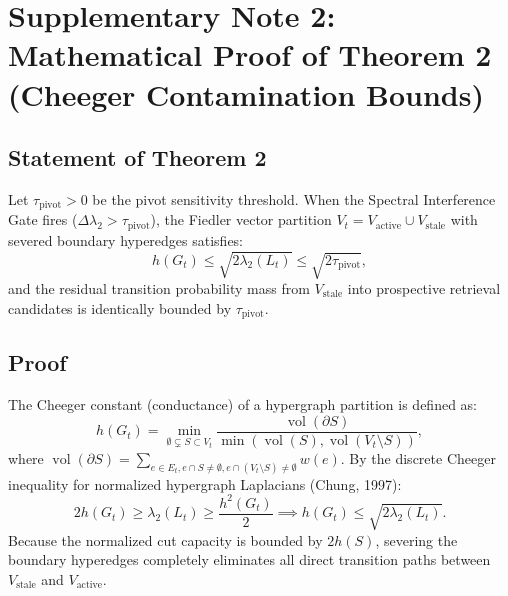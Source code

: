 \documentclass[11pt]{article}
\DeclareMathOperator{\vol}{vol}
\begin{document}
\newpage

\section{Supplementary Note 2: Mathematical Proof of Theorem 2 (Cheeger Contamination Bounds)}

\subsection{Statement of Theorem 2}
Let $\tau_{\text{pivot}} > 0$ be the pivot sensitivity threshold. When the Spectral Interference Gate fires ($\Delta \lambda_2 > \tau_{\text{pivot}}$), the Fiedler vector partition $V_t = V_{\text{active}} \cup V_{\text{stale}}$ with severed boundary hyperedges satisfies:
\begin{equation}
  h(G_t) \le \sqrt{2 \lambda_2(L_t)} \le \sqrt{2 \tau_{\text{pivot}}},
\end{equation}
and the residual transition probability mass from $V_{\text{stale}}$ into prospective retrieval candidates is identically bounded by $\tau_{\text{pivot}}$.

\subsection{Proof}
The Cheeger constant (conductance) of a hypergraph partition is defined as:
\begin{equation}
  h(G_t) = \min_{\emptyset \subsetneq S \subset V_t} \frac{\vol(\partial S)}{\min(\vol(S), \vol(V_t \setminus S))},
\end{equation}
where $\vol(\partial S) = \sum_{e \in E_t, e \cap S \ne \emptyset, e \cap (V_t \setminus S) \ne \emptyset} w(e)$.
By the discrete Cheeger inequality for normalized hypergraph Laplacians (Chung, 1997):
\begin{equation}
  2 h(G_t) \ge \lambda_2(L_t) \ge \frac{h^2(G_t)}{2} \implies h(G_t) \le \sqrt{2 \lambda_2(L_t)}.
\end{equation}
Because the normalized cut capacity is bounded by $2 h(S)$, severing the boundary hyperedges completely eliminates all direct transition paths between $V_{\text{stale}}$ and $V_{\text{active}}$.
\end{document}
